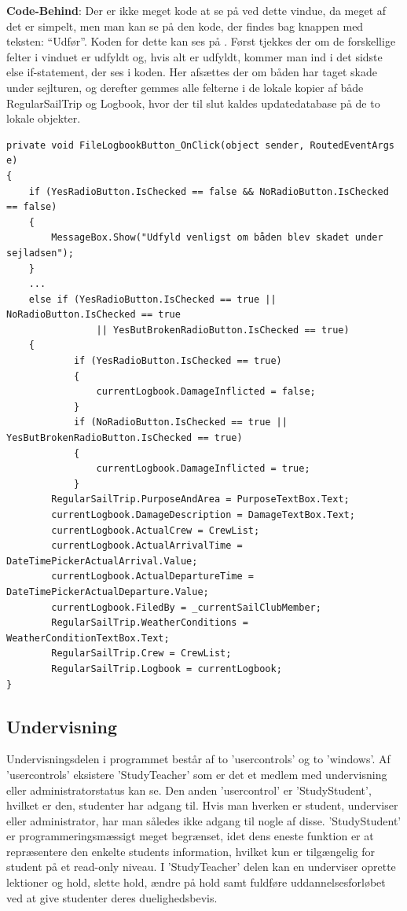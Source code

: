 \textbf{Code-Behind}: Der er ikke meget kode at se på ved dette vindue, da meget af det er simpelt, men man kan se på den kode, der findes bag knappen med teksten: ``Udfør''.
Koden for dette kan ses på .
Først tjekkes der om de forskellige felter i vinduet er udfyldt og, hvis alt er udfyldt, kommer man ind i det sidste else if-statement, der ses i koden. 
Her afsættes der om båden har taget skade under sejlturen, og derefter gemmes alle felterne i de lokale kopier af både RegularSailTrip og Logbook, hvor der til slut kaldes updatedatabase på de to lokale objekter.

\begin{lstlisting}[frame=single, caption= Gem Logbog, label=SaveLogbookButton]
private void FileLogbookButton_OnClick(object sender, RoutedEventArgs e)
{
	if (YesRadioButton.IsChecked == false && NoRadioButton.IsChecked == false)
	{
	    MessageBox.Show("Udfyld venligst om båden blev skadet under sejladsen");
	}
	...
	else if (YesRadioButton.IsChecked == true || NoRadioButton.IsChecked == true
	            || YesButBrokenRadioButton.IsChecked == true) 
	{
	        if (YesRadioButton.IsChecked == true)
	        {
	            currentLogbook.DamageInflicted = false;
	        }      
	        if (NoRadioButton.IsChecked == true || YesButBrokenRadioButton.IsChecked == true)
	        {
	            currentLogbook.DamageInflicted = true;
	        }
	    RegularSailTrip.PurposeAndArea = PurposeTextBox.Text;
	    currentLogbook.DamageDescription = DamageTextBox.Text;
	    currentLogbook.ActualCrew = CrewList;
	    currentLogbook.ActualArrivalTime = DateTimePickerActualArrival.Value;
	    currentLogbook.ActualDepartureTime = DateTimePickerActualDeparture.Value;
	    currentLogbook.FiledBy = _currentSailClubMember;
	    RegularSailTrip.WeatherConditions = WeatherConditionTextBox.Text;
	    RegularSailTrip.Crew = CrewList;
	    RegularSailTrip.Logbook = currentLogbook;
}
\end{lstlisting}



\subsection{Undervisning}
Undervisningsdelen i programmet består af to 'usercontrols' og to 'windows'.
Af 'usercontrols' eksistere 'StudyTeacher' som er det et medlem med undervisning eller administratorstatus kan se.
Den anden 'usercontrol' er 'StudyStudent', hvilket er den, studenter har adgang til. Hvis man hverken er student, underviser eller administrator, har man således ikke adgang til nogle af disse. 
'StudyStudent' er programmeringsmæssigt meget begrænset, idet dens eneste funktion er at repræsentere den enkelte students information, hvilket kun er tilgængelig for student på et read-only niveau.
I 'StudyTeacher' delen kan en underviser oprette lektioner og hold, slette hold, ændre på hold samt fuldføre uddannelsesforløbet ved at give studenter deres duelighedsbevis.

